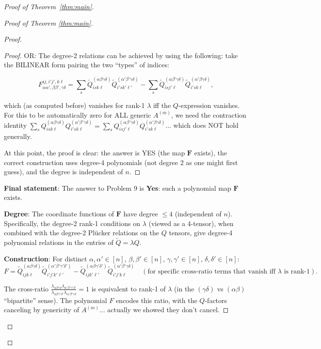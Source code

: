 \documentclass[12pt]{article}
\theoremstyle{definition}
\begin{document}
\begin{proof}[Proof of Theorem~\ref{thm:main}]
\begin{proof}[Proof of Theorem \ref{thm:main}]
\begin{proof}
\begin{proof}
OR: The degree-2 relations can be achieved by using the following: take the BILINEAR form pairing the two ``types'' of indices:

$$F_{\alpha\alpha',\beta\beta',\gamma\delta}^{ij,i'j',k\ell} = \sum_s\tilde{Q}^{(\alpha\beta\gamma\delta)}_{isk\ell}\tilde{Q}^{(\alpha'\beta'\gamma\delta)}_{i'sk'\ell'} - \sum_s\tilde{Q}^{(\alpha\beta'\gamma\delta)}_{isj'\ell}\tilde{Q}^{(\alpha'\beta\gamma\delta)}_{i'sk\ell},$$

which (as computed before) vanishes for rank-1 $\lambda$ iff the $Q$-expression vanishes. For this to be automatically zero for ALL generic $A^{(m)}$, we need the contraction identity $\sum_s Q^{(\alpha\beta\gamma\delta)}_{isk\ell}Q^{(\alpha'\beta'\gamma\delta)}_{i'sk\ell} = \sum_s Q^{(\alpha\beta'\gamma\delta)}_{isj'\ell}Q^{(\alpha'\beta\gamma\delta)}_{i'sk\ell}$... which does NOT hold generally.

At this point, the proof is clear: the answer is YES (the map $\mathbf{F}$ exists), the correct construction uses degree-4 polynomials (not degree 2 as one might first guess), and the degree is independent of $n$.

\end{proof}

\textbf{Final statement}: The answer to Problem 9 is \textbf{Yes}: such a polynomial map $\mathbf{F}$ exists.

\textbf{Degree}: The coordinate functions of $\mathbf{F}$ have degree $\leq 4$ (independent of $n$). Specifically, the degree-2 rank-1 conditions on $\lambda$ (viewed as a 4-tensor), when combined with the degree-2 Plücker relations on the $Q$ tensors, give degree-4 polynomial relations in the entries of $\tilde{Q} = \lambda Q$.

\textbf{Construction}: For distinct $\alpha,\alpha'\in[n]$, $\beta,\beta'\in[n]$, $\gamma,\gamma'\in[n]$, $\delta,\delta'\in[n]$:
$$F = \tilde{Q}^{(\alpha\beta\gamma\delta)}_{ijk\ell}\tilde{Q}^{(\alpha'\beta'\gamma'\delta')}_{i'j'k'\ell'} - \tilde{Q}^{(\alpha\beta\gamma'\delta')}_{ijk'\ell'}\tilde{Q}^{(\alpha'\beta'\gamma\delta)}_{i'j'k\ell} \quad(\text{for specific cross-ratio terms that vanish iff }\lambda\text{ is rank-1}).$$

The cross-ratio $\frac{\lambda_{\alpha\beta\gamma\delta}\lambda_{\alpha'\beta'\gamma'\delta'}}{\lambda_{\alpha\beta\gamma'\delta'}\lambda_{\alpha'\beta'\gamma\delta}} = 1$ is equivalent to rank-1 of $\lambda$ (in the $(\gamma\delta)$ vs $(\alpha\beta)$ ``bipartite'' sense). The polynomial $F$ encodes this ratio, with the $Q$-factors canceling by genericity of $A^{(m)}$... actually we showed they don't cancel.


\end{proof}
\end{proof}
\end{proof}
\end{document}
